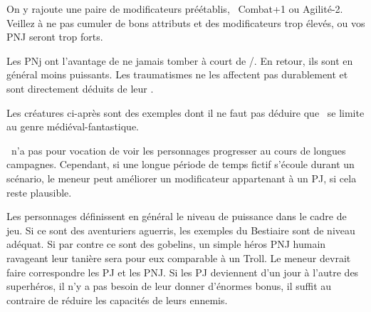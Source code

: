 {		\nipajinTableNSC

		\noindent
		On y rajoute une paire de modificateurs préétablis, \pe\ Combat+1 ou Agilité-2. Veillez à ne pas cumuler de bons attributs et des modificateurs trop élevés, ou vos PNJ seront trop forts.

		Les PNj ont l'avantage de ne jamais tomber à court de \AD/\RD. En retour, ils sont en général moins puissants. Les traumatismes ne les affectent pas durablement et sont directement déduits de leur \HD.


		\noindent
		Les créatures ci-après sont des exemples dont il ne faut pas déduire que \nipajin\ se limite au genre médiéval-fantastique.

		\nipajinTableBestiary


		\noindent
		\nipajin\ n'a pas pour vocation de voir les personnages progresser au cours de longues campagnes. Cependant, si une longue période de temps fictif s'écoule durant un scénario, le meneur peut améliorer un modificateur appartenant à un PJ, si cela reste plausible.

		Les personnages définissent en général le niveau de puissance dans le cadre de jeu. Si ce sont des aventuriers aguerris, les exemples du Bestiaire sont de niveau adéquat. Si par contre ce sont des gobelins, un simple héros PNJ humain ravageant leur tanière sera pour eux comparable à un Troll. Le meneur devrait faire correspondre les PJ et les PNJ. Si les PJ deviennent d'un jour à l'autre des superhéros, il n'y a pas besoin de leur donner d'énormes bonus, il suffit au contraire de réduire les capacités de leurs ennemis.
}
